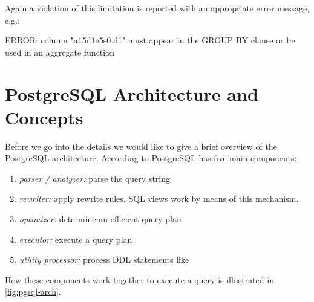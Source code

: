 \noindent
Again a violation of this limitation is reported with an appropriate
error message, e.g.:

\begin{interactive}
ERROR:  column "a15d1e5s0.d1" must appear in the GROUP BY clause or be used 
in an aggregate function
\end{interactive}


\section{PostgreSQL Architecture and Concepts}

Before we go into the details we would like to give a brief overview
of the PostgreSQL architecture. According to \citep{Conway2006a} PostgreSQL
has five main components:

\begin{enumerate}
\item \emph{parser / analyzer:\/} parse the query string
\item \emph{rewriter:\/} apply rewrite rules. SQL views work by means of this mechanism.
\item \emph{optimizer:\/} determine an efficient query plan
\item \emph{executor:\/} execute a query plan
\item \emph{utility processor:\/} process DDL statements like 
\end{enumerate}

\noindent
How these components work together to execute a query is illustrated
in \autoref{fig:pgsql-arch}.

